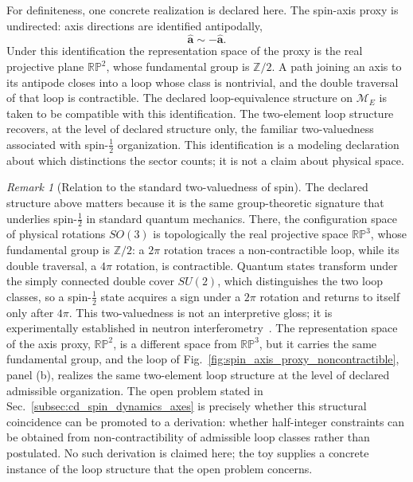 \documentclass[aps,prx,onecolumn,11pt]{revtex4-2}
\theoremstyle{plain}
\theoremstyle{definition}
\theoremstyle{remark}
\newtheorem{remark}{Remark}
\begin{document}
For definiteness, one concrete realization is declared here. The
spin-axis proxy is undirected: axis directions are identified
antipodally,
\[
\hat{\mathbf a}\sim-\hat{\mathbf a}.
\]
Under this identification the representation space of the proxy is the
real projective plane \(\mathbb{RP}^2\), whose fundamental group is
\(\mathbb Z/2\). A path joining an axis to its antipode closes into a
loop whose class is nontrivial, and the double traversal of that loop
is contractible. The declared loop-equivalence structure on
\(\mathcal M_E\) is taken to be compatible with this identification.
The two-element loop structure recovers, at the level of declared
structure only, the familiar two-valuedness associated with
spin-\(\tfrac{1}{2}\) organization. This identification is a modeling
declaration about which distinctions the sector counts; it is not a
claim about physical space.

\begin{remark}[Relation to the standard two-valuedness of spin]
\label{rem:spin_two_valuedness}
The declared structure above matters because it is the same
group-theoretic signature that underlies spin-\(\tfrac{1}{2}\) in
standard quantum mechanics. There, the configuration space of physical
rotations \(SO(3)\) is topologically the real projective space
\(\mathbb{RP}^3\), whose fundamental group is \(\mathbb Z/2\): a
\(2\pi\) rotation traces a non-contractible loop, while its double
traversal, a \(4\pi\) rotation, is contractible. Quantum states
transform under the simply connected double cover \(SU(2)\), which
distinguishes the two loop classes, so a spin-\(\tfrac{1}{2}\) state
acquires a sign under a \(2\pi\) rotation and returns to itself only
after \(4\pi\). This two-valuedness is not an interpretive gloss; it
is experimentally established in neutron
interferometry~\cite{Rauch1975,Werner1975}. The representation space
of the axis proxy, \(\mathbb{RP}^2\), is a different space from
\(\mathbb{RP}^3\), but it carries the same fundamental group, and the
loop of Fig.~\ref{fig:spin_axis_proxy_noncontractible}, panel (b),
realizes the same two-element loop structure at the level of declared
admissible organization. The open problem stated in
Sec.~\ref{subsec:cd_spin_dynamics_axes} is precisely whether this
structural coincidence can be promoted to a derivation: whether
half-integer constraints can be obtained from non-contractibility of
admissible loop classes rather than postulated. No such derivation is
claimed here; the toy supplies a concrete instance of the loop
structure that the open problem concerns.
\end{remark}
\end{document}
